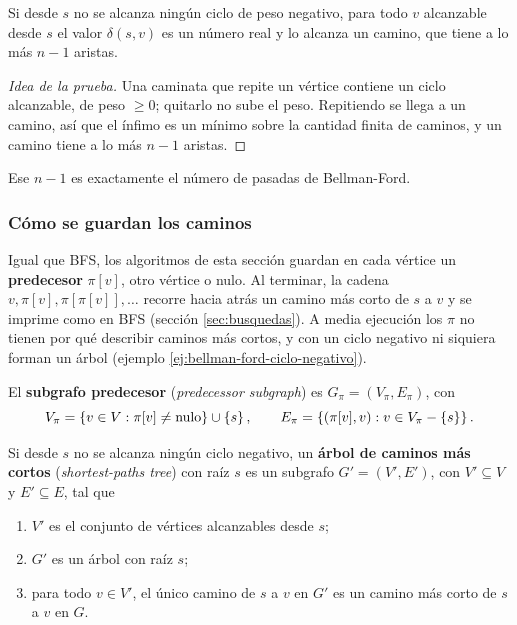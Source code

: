 \documentclass[11pt,letterpaper]{article}
\begin{document}
\begin{proposicion}\label{prop:caminos-simples-fuente}
  Si desde $s$ no se alcanza ningún ciclo de peso negativo, para todo
  $v$ alcanzable desde $s$ el valor $\delta(s, v)$ es un número real
  y lo alcanza un camino, que tiene a lo más $n - 1$ aristas.
\end{proposicion}

\begin{proof}[Idea de la prueba]
  Una caminata que repite un vértice contiene un ciclo alcanzable,
  de peso $\ge 0$; quitarlo no sube el peso. Repitiendo se llega a un
  camino, así que el ínfimo es un mínimo sobre la cantidad finita de
  caminos, y un camino tiene a lo más $n - 1$ aristas.
\end{proof}

Ese $n - 1$ es exactamente el número de pasadas de Bellman-Ford.

\subsubsection*{Cómo se guardan los caminos}

Igual que BFS, los algoritmos de esta sección guardan en cada vértice
un \textbf{predecesor} $\pi[v]$, otro vértice o nulo. Al terminar, la
cadena $v, \pi[v], \pi[\pi[v]], \dots$ recorre hacia atrás un camino
más corto de $s$ a $v$ y se imprime como en BFS (sección
\ref{sec:busquedas}). A media ejecución los $\pi$ no tienen por qué
describir caminos más cortos, y con un ciclo negativo ni siquiera
forman un árbol (ejemplo \ref{ej:bellman-ford-ciclo-negativo}).

\begin{definicion}
  \label{def:subgrafo-pred-fuente}
  El \textbf{subgrafo predecesor} (\textit{predecessor subgraph}) es
  $G_\pi = (V_\pi, E_\pi)$, con
  \[
    V_\pi = \left\{ v \in V : \pi[v] \neq \text{nulo} \right\} \cup \left\{ s \right\} ,
    \qquad
    E_\pi = \left\{ (\pi[v], v) : v \in V_\pi - \left\{ s \right\} \right\} .
  \]
\end{definicion}

\begin{definicion}
  \label{def:arbol-caminos-cortos}
  Si desde $s$ no se alcanza ningún ciclo negativo, un \textbf{árbol
  de caminos más cortos} (\textit{shortest-paths tree}) con raíz $s$
  es un subgrafo $G' = (V', E')$, con $V' \subseteq V$ y
  $E' \subseteq E$, tal que
  \begin{enumerate}[itemsep=0.1em]
    \item $V'$ es el conjunto de vértices alcanzables desde $s$;
    \item $G'$ es un árbol con raíz $s$;
    \item para todo $v \in V'$, el único camino de $s$ a $v$ en $G'$
          es un camino más corto de $s$ a $v$ en $G$.
  \end{enumerate}
\end{definicion}
\end{document}

